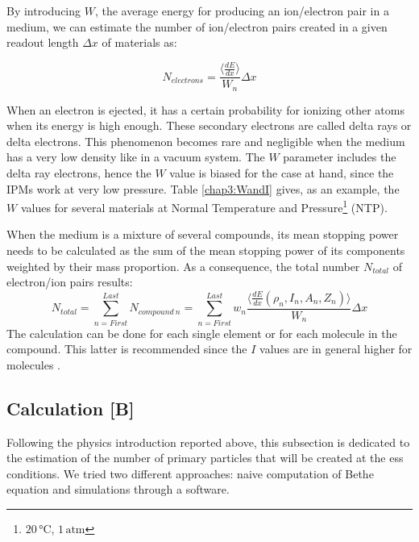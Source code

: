 \begin{refsection}
  By introducing \(W\), the average energy for producing an ion/electron pair in a medium, we can estimate the number of ion/electron pairs created in a given readout length $\Delta x$ of materials \cite{Weiss1955,Bichsel1979} as:

  \begin{equation}
    N_{electrons}= \frac{\big \langle \frac{dE}{dx} \big \rangle}{W_{n}} \Delta x
  \end{equation}

  When an electron is ejected, it has a certain probability for ionizing other atoms when its energy is high enough. These secondary electrons are called delta rays or delta electrons. This phenomenon becomes rare and negligible when the medium has a very low density like in a vacuum system. The \(W\) parameter includes the delta ray electrons, hence the \(W\) value is biased \cite[p. 470]{Tanabashi2018} for the case at hand, since the IPMs work at very low pressure. Table \ref{chap3:WandI} gives, as an example, the \(W\) values for several materials at Normal Temperature and Pressure\footnote{$20\,\mathrm{°C}$, $1\,\mathrm{atm}$} (NTP).

  

  When the medium is a mixture of several compounds, its mean stopping power needs to be calculated as the sum of the mean stopping power of its components weighted by their mass proportion. As a consequence, the total number $N_{total}$ of electron/ion pairs results:
  \begin{equation}
    N_{total}= \sum_{n= First}^{Last} N_{compound\ n}= \sum_{n= First}^{Last} w_{n} \frac{\big \langle \frac{dE}{dx}\left(\rho_{n},I_{n},A_{n},Z_{n}\right) \big \rangle}{W_{n}} \Delta x
  \end{equation}
  The calculation can be done for each single element or for each molecule in the compound.
  This latter is recommended since the \(I\) values are in general higher for molecules \cite[p. 451]{Tanabashi2018}.

  \subsection{Calculation [B]}
  \label{chap3:calc}
  Following the physics introduction reported above, this subsection is dedicated to the estimation of the number of primary particles that will be created at the \acrshort{ess} conditions. We tried two different approaches: naive computation of Bethe equation and simulations through a software.


\end{refsection}
